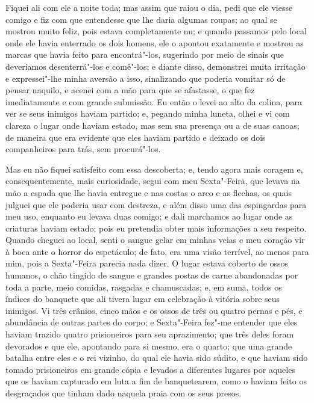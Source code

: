 Fiquei ali com ele a noite toda; mas assim que raiou o dia, pedi que ele
viesse comigo e fiz com que entendesse que lhe daria algumas roupas; ao
qual se mostrou muito feliz, pois estava completamente nu; e quando
passamos pelo local onde ele havia enterrado os dois homens, ele o
apontou exatamente e mostrou as marcas que havia feito para
encontrá"-los, sugerindo por meio de sinais que deveríamos desenterrá"-los
e comê"-los; e diante disso, demonstrei muita irritação e expressei"-lhe
minha aversão a isso, sinalizando que poderia vomitar só de pensar
naquilo, e acenei com a mão para que se afastasse, o que fez
imediatamente e com grande submissão. Eu então o levei ao alto da
colina, para ver se seus inimigos haviam partido; e, pegando minha
luneta, olhei e vi com clareza o lugar onde haviam estado, mas sem sua
presença ou a de suas canoas; de maneira que era evidente que eles
haviam partido e deixado os dois companheiros para trás, sem
procurá"-los.

Mas eu não fiquei satisfeito com essa descoberta; e, tendo agora mais
coragem e, consequentemente, mais curiosidade, segui com meu
Sexta"-Feira, que levava na mão a espada que lhe havia entregue e nas
costas o arco e as flechas, os quais julguei que ele poderia usar com
destreza, e além disso uma das espingardas para meu uso, enquanto eu
levava duas comigo; e dali marchamos ao lugar onde as criaturas haviam
estado; pois eu pretendia obter mais informações a seu respeito. Quando
cheguei ao local, senti o sangue gelar em minhas veias e meu coração vir
à boca ante o horror do espetáculo; de fato, era uma visão terrível, ao
menos para mim, pois a Sexta"-Feira parecia nada dizer. O lugar estava
coberto de ossos humanos, o chão tingido de sangue e grandes postas de
carne abandonadas por toda a parte, meio comidas, rasgadas e
chamuscadas; e, em suma, todos os índices do banquete que ali tivera
lugar em celebração à vitória sobre seus inimigos. Vi três crânios,
cinco mãos e os ossos de três ou quatro pernas e pés, e abundância de
outras partes do corpo; e Sexta"-Feira fez"-me entender que eles haviam
trazido quatro prisioneiros para seu aprazimento; que três deles foram
devorados e que ele, apontando para si mesmo, era o quarto; que uma
grande batalha entre eles e o rei vizinho, do qual ele havia sido
súdito, e que haviam sido tomado prisioneiros em grande cópia e levados
a diferentes lugares por aqueles que os haviam capturado em luta a fim
de banquetearem, como o haviam feito os desgraçados que tinham dado
naquela praia com os seus presos.

